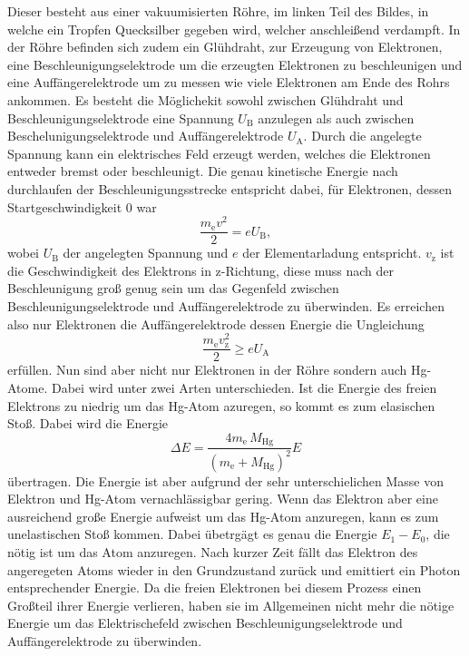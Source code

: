 Dieser besteht aus einer vakuumisierten Röhre, im linken Teil des Bildes, in welche ein Tropfen Quecksilber gegeben wird, welcher anschleißend verdampft.
In der Röhre befinden sich zudem ein Glühdraht, zur Erzeugung von Elektronen, eine Beschleunigungselektrode um die erzeugten Elektronen zu beschleunigen und eine Auffängerelektrode um zu messen wie viele Elektronen am Ende des Rohrs ankommen.
Es besteht die Möglichekit sowohl zwischen Glühdraht und Beschleunigungselektrode eine Spannung $U_\text{B}$ anzulegen als auch zwischen Beschelunigungselektrode und Auffängerelektrode $U_\text{A}$.
Durch die angelegte Spannung kann ein elektrisches Feld erzeugt werden, welches die Elektronen entweder bremst oder beschleunigt.
Die genau kinetische Energie nach durchlaufen der Beschleunigungsstrecke entspricht dabei, für Elektronen, dessen Startgeschwindigkeit 0 war
\begin{equation}
    \frac{m_\text{e} v^2}{2} = eU_\text{B},
    \label{eq:Energieelek}
\end{equation}
wobei $U_\text{B}$ der angelegten Spannung und $e$ der Elementarladung entspricht.
$v_\text{z}$ ist die Geschwindigkeit des Elektrons in z-Richtung, diese muss nach der Beschleunigung groß genug sein um das Gegenfeld zwischen Beschleunigungselektrode und Auffängerelektrode zu überwinden.
Es erreichen also nur Elektronen die Auffängerelektrode dessen Energie die Ungleichung
\begin{equation*}
    \frac{m_\text{e} v_\text{z}^2}{2} \geq eU_\text{A} 
\end{equation*}
erfüllen.
Nun sind aber nicht nur Elektronen in der Röhre sondern auch Hg-Atome.
Dabei wird unter zwei Arten unterschieden.
Ist die Energie des freien Elektrons zu niedrig um das Hg-Atom azuregen, so kommt es zum elasischen Stoß.
Dabei wird die Energie 
\begin{equation*}
    \Delta E = \frac{4m_\text{e}\, M_\text{Hg}}{\left (m_\text{e} + M_\text{Hg} \right )^2} E
\end{equation*}
übertragen.
Die Energie ist aber aufgrund der sehr unterschielichen Masse von Elektron und Hg-Atom vernachlässigbar gering.
Wenn das Elektron aber eine ausreichend große Energie aufweist um das Hg-Atom anzuregen, kann es zum unelastischen Stoß kommen.
Dabei übetrgägt es genau die Energie $E_1 - E_0$, die nötig ist um das Atom anzuregen.
Nach kurzer Zeit fällt das Elektron des angeregeten Atoms wieder in den Grundzustand zurück und emittiert ein Photon entsprechender Energie.
Da die freien Elektronen bei diesem Prozess einen Großteil ihrer Energie verlieren, haben sie im Allgemeinen nicht mehr die nötige Energie um das Elektrischefeld zwischen Beschleunigungselektrode und Auffängerelektrode zu überwinden.
